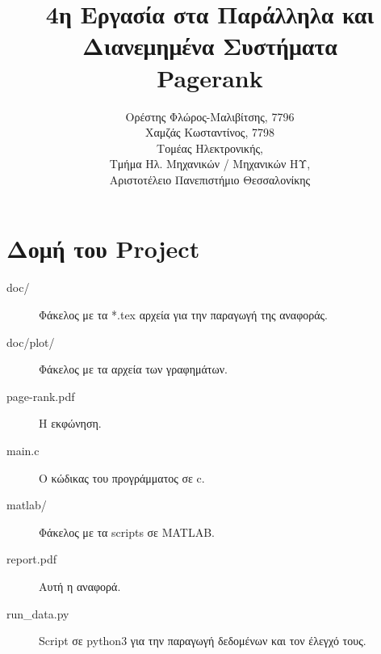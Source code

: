 
\usepackage{fontspec}
\setmainfont{DejaVu Serif}
\renewcommand{\contentsname}{Περιεχόμενα}
\renewcommand{\listfigurename}{Λίστα Σχημάτων}
\renewcommand{\figurename}{Σχήμα}
\renewcommand{\lstlistingname}{Καταχώρηση}
\renewcommand{\lstlistlistingname}{List of \lstlistingname s}

\title{4η Εργασία στα Παράλληλα και Διανεμημένα Συστήματα\\Pagerank}
\author{Ορέστης Φλώρος-Μαλιβίτσης, 7796\\
  Χαμζάς Κωσταντίνος, 7798\\
  Τομέας Ηλεκτρονικής,\\
  Τμήμα Ηλ. Μηχανικών / Μηχανικών ΗΥ,\\
  Αριστοτέλειο Πανεπιστήμιο Θεσσαλονίκης}


\maketitle
\tableofcontents
\newpage

\chapter*{Δομή του Project} \label{project-structure}

\begin{description}
	\item[doc/] Φάκελος με τα *.tex αρχεία για την παραγωγή της αναφοράς.
	\item[doc/plot/] Φάκελος με τα αρχεία των γραφημάτων.
	\item[page-rank.pdf] Η εκφώνηση.
	\item[main.c] Ο κώδικας του προγράμματος σε c.
	\item[matlab/] Φάκελος με τα scripts σε MATLAB.
	\item[report.pdf] Αυτή η αναφορά.
	\item[run\_data.py] Script σε python3 για την παραγωγή δεδομένων και τον έλεγχό τους.
\end{description}




